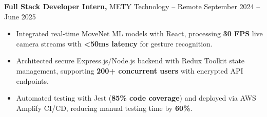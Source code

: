 \documentclass[11pt]{article}       %
\begin{document}
\textbf{Full Stack Developer Intern,} {METY Technology} -- Remote \hfill September 2024 -- June 2025 \\
\vspace{-9pt}
\begin{itemize}
  \item Integrated real-time MoveNet ML models with React, processing \textbf{30 FPS} live camera streams with \textbf{<50ms latency} for gesture recognition.
  \item Architected secure Express.js/Node.js backend with Redux Toolkit state management, supporting \textbf{200+ concurrent users} with encrypted API endpoints.
  \item Automated testing with Jest (\textbf{85\% code coverage}) and deployed via AWS Amplify CI/CD, reducing manual testing time by \textbf{60\%}.
\end{itemize}

\end{document}

